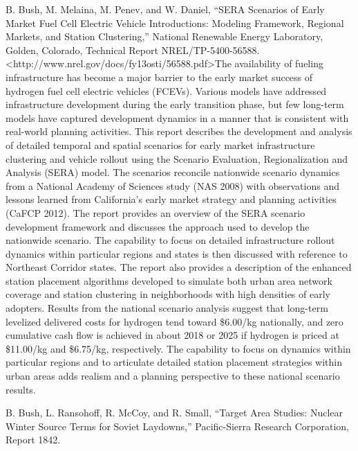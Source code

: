 \documentclass[]{article}
\begin{document}
B. Bush, M. Melaina, M. Penev, and W. Daniel, ``SERA Scenarios of Early
Market Fuel Cell Electric Vehicle Introductions: Modeling Framework,
Regional Markets, and Station Clustering,'' National Renewable Energy
Laboratory, Golden, Colorado, Technical Report NREL/TP-5400-56588.
\textless{}http://www.nrel.gov/docs/fy13osti/56588.pdf\textgreater{}The
availability of fueling infrastructure has become a major barrier to the
early market success of hydrogen fuel cell electric vehicles (FCEVs).
Various models have addressed infrastructure development during the
early transition phase, but few long-term models have captured
development dynamics in a manner that is consistent with real-world
planning activities. This report describes the development and analysis
of detailed temporal and spatial scenarios for early market
infrastructure clustering and vehicle rollout using the Scenario
Evaluation, Regionalization and Analysis (SERA) model. The scenarios
reconcile nationwide scenario dynamics from a National Academy of
Sciences study (NAS 2008) with observations and lessons learned from
California's early market strategy and planning activities (CaFCP 2012).
The report provides an overview of the SERA scenario development
framework and discusses the approach used to develop the nationwide
scenario. The capability to focus on detailed infrastructure rollout
dynamics within particular regions and states is then discussed with
reference to Northeast Corridor states. The report also provides a
description of the enhanced station placement algorithms developed to
simulate both urban area network coverage and station clustering in
neighborhoods with high densities of early adopters. Results from the
national scenario analysis suggest that long-term levelized delivered
costs for hydrogen tend toward \$6.00/kg nationally, and zero cumulative
cash flow is achieved in about 2018 or 2025 if hydrogen is priced at
\$11.00/kg and \$6.75/kg, respectively. The capability to focus on
dynamics within particular regions and to articulate detailed station
placement strategies within urban areas adds realism and a planning
perspective to these national scenario results.

B. Bush, L. Ransohoff, R. McCoy, and R. Small, ``Target Area Studies:
Nuclear Winter Source Terms for Soviet Laydowns,'' Pacific-Sierra
Research Corporation, Report 1842.
\end{document}
